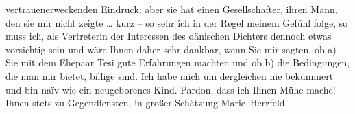 \begin{ledgroupsized}[t]{13cm}
               vertrauenerweckenden Eindruck; aber sie hat einen Gesellschafter, ihren Mann, den sie mir nicht zeigte {\dots} kurz – so sehr ich in der Regel meinem Gefühl folge, so
               muss ich, als Vertreterin der Interessen des dänischen Dichters dennoch etwas vorsichtig sein und wäre Ihnen
               daher sehr dankbar, wenn Sie mir sagten, {\pb}ob \introOben{}a)\introOben{} Sie mit dem Ehepaar Tesi gute Erfahrungen machten und ob b) die Bedingungen, die man mir bietet,
               billige sind. Ich habe mich um dergleichen nie bekümmert und bin naïv wie ein
               neugeborenes Kind.\pend
           \pstart
           Pardon, dass ich Ihnen Mühe mache! Ihnen stets zu Gegendiensten, in großer
               Schätzung\pend
           \pstart \spacefill\mbox{Marie Herzfeld}\pend{}
         
         \endnumbering{}\end{ledgroupsized}  \newcommand{\dateiname}{L02593}\newcommand{\titel}{Marie Herzfeld an Arthur Schnitzler, 19. 4. 1909}\newcommand{\editorInnen}{Martin Anton Müller und Laura Untner}
      